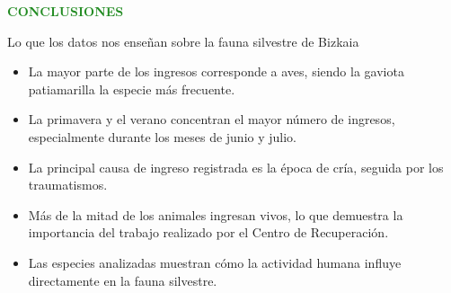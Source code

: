 \documentclass[11pt,a4paper]{article}
\begin{document}

\newpage
\thispagestyle{empty}

\begin{center}

\vspace*{0.65cm}

{\fontsize{26}{30}\selectfont
\textcolor{ForestGreen}{\textbf{CONCLUSIONES}}
}

\vspace{0.25cm}

{\large
Lo que los datos nos enseñan sobre la fauna silvestre de Bizkaia
}

\end{center}

\vspace{0.55cm}


\begin{tcolorbox}[
colback=Beige,
colframe=ForestGreen,
title=\faChartLine\ Principales hallazgos,
fonttitle=\bfseries,
top=4mm,
bottom=4mm,
left=3mm,
right=3mm]

\begin{itemize}
\setlength{\itemsep}{5pt}

\item La mayor parte de los ingresos corresponde a aves, siendo la gaviota patiamarilla la especie más frecuente.

\item La primavera y el verano concentran el mayor número de ingresos, especialmente durante los meses de junio y julio.

\item La principal causa de ingreso registrada es la época de cría, seguida por los traumatismos.

\item Más de la mitad de los animales ingresan vivos, lo que demuestra la importancia del trabajo realizado por el Centro de Recuperación.

\item Las especies analizadas muestran cómo la actividad humana influye directamente en la fauna silvestre.

\end{itemize}

\end{tcolorbox}
\end{document}

